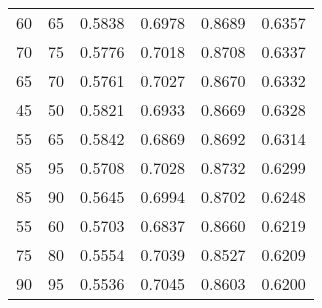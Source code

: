\begin{center}
\begin{longtable}{|l|l|l|l|l|l|}
60 & 65 & 0.5838 & 0.6978 & 0.8689 & 0.6357 \\
70 & 75 & 0.5776 & 0.7018 & 0.8708 & 0.6337 \\
65 & 70 & 0.5761 & 0.7027 & 0.8670 & 0.6332 \\
45 & 50 & 0.5821 & 0.6933 & 0.8669 & 0.6328 \\
55 & 65 & 0.5842 & 0.6869 & 0.8692 & 0.6314 \\
85 & 95 & 0.5708 & 0.7028 & 0.8732 & 0.6299 \\
85 & 90 & 0.5645 & 0.6994 & 0.8702 & 0.6248 \\
55 & 60 & 0.5703 & 0.6837 & 0.8660 & 0.6219 \\
75 & 80 & 0.5554 & 0.7039 & 0.8527 & 0.6209 \\
90 & 95 & 0.5536 & 0.7045 & 0.8603 & 0.6200
\end{longtable}

\end{center}

